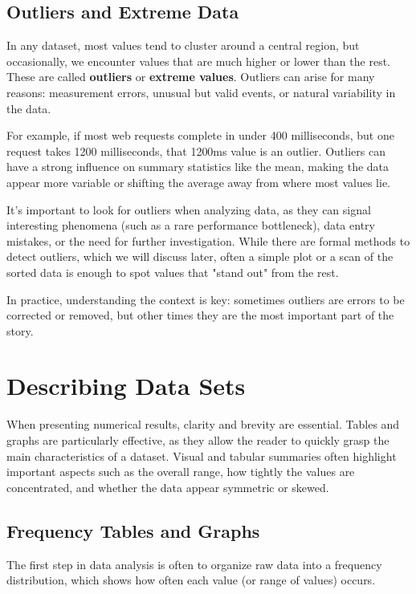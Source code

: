 \subsection*{Outliers and Extreme Data}

In any dataset, most values tend to cluster around a central region, but occasionally, we encounter values that are much higher or lower than the rest. These are called \textbf{outliers} or \textbf{extreme values}. Outliers can arise for many reasons: measurement errors, unusual but valid events, or natural variability in the data.

For example, if most web requests complete in under 400 milliseconds, but one request takes 1200 milliseconds, that 1200ms value is an outlier. Outliers can have a strong influence on summary statistics like the mean, making the data appear more variable or shifting the average away from where most values lie.

It's important to look for outliers when analyzing data, as they can signal interesting phenomena (such as a rare performance bottleneck), data entry mistakes, or the need for further investigation. While there are formal methods to detect outliers, which we will discuss later, often a simple plot or a scan of the sorted data is enough to spot values that "stand out" from the rest.

In practice, understanding the context is key: sometimes outliers are errors to be corrected or removed, but other times they are the most important part of the story.

\section{Describing Data Sets}
When presenting numerical results, clarity and brevity are essential. Tables and graphs are particularly effective, as they allow the reader to quickly grasp the main characteristics of a dataset. Visual and tabular summaries often highlight important aspects such as the overall range, how tightly the values are concentrated, and whether the data appear symmetric or skewed.

\subsection*{Frequency Tables and Graphs} \label{sub:frequency_tables_and_graphs}

The first step in data analysis is often to organize raw data into a frequency distribution, which shows how often each value (or range of values) occurs.

